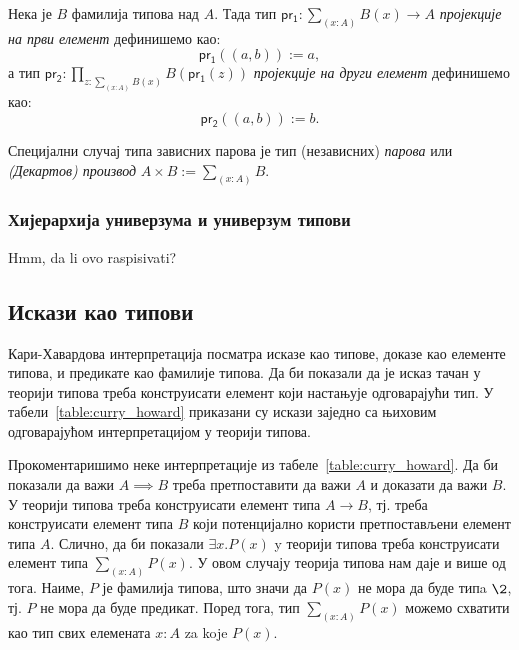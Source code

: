 \documentclass[12pt,oneside]{memoir}
\begin{document}
\begin{definition} 
    Нека је $B$ фамилија типова над $A$. Тада тип $\mathsf{pr_1} : \sum_{(x : A)} B(x) \to A$ \emph{пројекције на први елемент} дефинишемо као: 
    \begin{equation}
        \mathsf{pr_1} ((a, b)):= a,
    \end{equation}
    а тип $\mathsf{pr_2} : \prod_{z : \sum_{(x : A)} B(x)} B(\mathsf{pr_1}(z))$ \emph{пројекције на други елемент} дефинишемо као:
    \begin{equation}
        \mathsf{pr_2} ((a, b)):= b.
    \end{equation}
\end{definition}

Специјални случај типа зависних парова је тип (независних) \emph{парова} или \emph{(Декартов) производ} $A \times B := \sum_{(x : A)} B$.

\subsubsection{Хијерархија универзума и универзум типови}

{\color{red}Hmm, da li ovo raspisivati?}

\subsection{Искази као типови}

Кари\--Хавардова интерпретација посматра исказе као типове, доказе као елементе типова, и предикате као фамилије типова. Да би показали да је исказ тачан у теорији типова треба конструисати елемент који настањује одговарајући тип. У табели~\ref{table:curry_howard} приказани су искази заједно са њиховим одговарајућом интерпретацијом у теорији типова.

Прокоментаришимо неке интерпретације из табеле~\ref{table:curry_howard}. Да би показали да важи $A \implies B$ треба претпоставити да важи $A$ и доказати да важи $B$. У теорији типова треба конструисати елемент типа $A \to B$, тј. треба конструисати елемент типа $B$ који потенцијално користи претпостављени елемент типа $A$. Слично, да би показали $\exists x. P(x)$ y теорији типова треба конструисати елемент типа $\sum_{(x : A)} P(x)$. У овом случају теорија типова нам даје и више од тога. Наиме, $P$ је фамилија типова, што значи да $P(x)$ не мора да буде типa $\2$, тј. $P$ не мора да буде предикат. Поред тога, тип $\sum_{(x : A)} P(x)$ можемо схватити као тип свих елемената $x : A$ za koje $P (x)$. 
\end{document}
